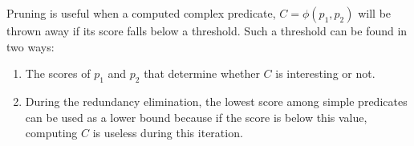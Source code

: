 Pruning is useful when a computed complex predicate, $C = \phi(p_1, p_2)$ will be thrown away if its score falls below a threshold.  Such a threshold can be found in two ways:
\begin{enumerate}
\item The scores of $p_1$ and $p_2$ that determine whether $C$ is interesting or not.
\item During the redundancy elimination, the lowest %
score among simple predicates can be used as a lower bound because if the score is below this value, computing $C$ is useless during this iteration.
\end{enumerate}

